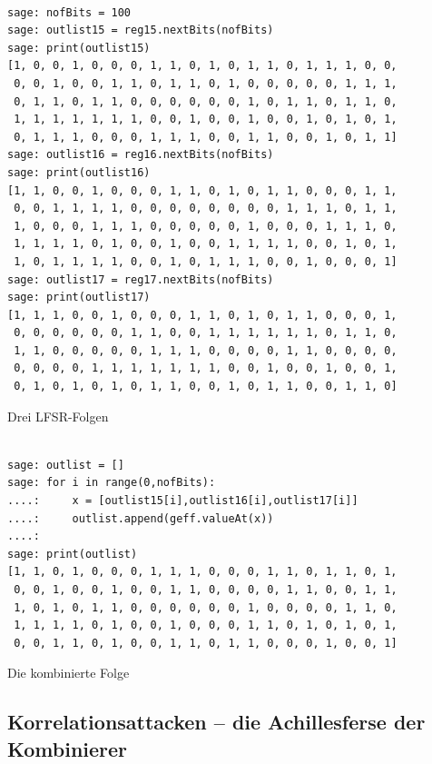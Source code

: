 \begin{refsegment}
\begin{sagecode}
\begin{verbatim}

sage: nofBits = 100
sage: outlist15 = reg15.nextBits(nofBits)
sage: print(outlist15)
[1, 0, 0, 1, 0, 0, 0, 1, 1, 0, 1, 0, 1, 1, 0, 1, 1, 1, 0, 0,
 0, 0, 1, 0, 0, 1, 1, 0, 1, 1, 0, 1, 0, 0, 0, 0, 0, 1, 1, 1,
 0, 1, 1, 0, 1, 1, 0, 0, 0, 0, 0, 0, 1, 0, 1, 1, 0, 1, 1, 0,
 1, 1, 1, 1, 1, 1, 1, 0, 0, 1, 0, 0, 1, 0, 0, 1, 0, 1, 0, 1,
 0, 1, 1, 1, 0, 0, 0, 1, 1, 1, 0, 0, 1, 1, 0, 0, 1, 0, 1, 1]
sage: outlist16 = reg16.nextBits(nofBits)
sage: print(outlist16)
[1, 1, 0, 0, 1, 0, 0, 0, 1, 1, 0, 1, 0, 1, 1, 0, 0, 0, 1, 1,
 0, 0, 1, 1, 1, 1, 0, 0, 0, 0, 0, 0, 0, 0, 1, 1, 1, 0, 1, 1,
 1, 0, 0, 0, 1, 1, 1, 0, 0, 0, 0, 0, 1, 0, 0, 0, 1, 1, 1, 0,
 1, 1, 1, 1, 0, 1, 0, 0, 1, 0, 0, 1, 1, 1, 1, 0, 0, 1, 0, 1,
 1, 0, 1, 1, 1, 1, 0, 0, 1, 0, 1, 1, 1, 0, 0, 1, 0, 0, 0, 1]
sage: outlist17 = reg17.nextBits(nofBits)
sage: print(outlist17)
[1, 1, 1, 0, 0, 1, 0, 0, 0, 1, 1, 0, 1, 0, 1, 1, 0, 0, 0, 1,
 0, 0, 0, 0, 0, 0, 1, 1, 0, 0, 1, 1, 1, 1, 1, 1, 0, 1, 1, 0,
 1, 1, 0, 0, 0, 0, 0, 1, 1, 1, 0, 0, 0, 0, 1, 1, 0, 0, 0, 0,
 0, 0, 0, 0, 1, 1, 1, 1, 1, 1, 1, 0, 0, 1, 0, 0, 1, 0, 0, 1,
 0, 1, 0, 1, 0, 1, 0, 1, 1, 0, 0, 1, 0, 1, 1, 0, 0, 1, 1, 0]
\end{verbatim}
\caption{Drei LFSR-Folgen}\label{Sage-code-bool-seqs}
\end{sagecode}
\clearpage

\begin{sagecode}
\begin{verbatim}

sage: outlist = []
sage: for i in range(0,nofBits):
....:     x = [outlist15[i],outlist16[i],outlist17[i]]
....:     outlist.append(geff.valueAt(x))
....:
sage: print(outlist)
[1, 1, 0, 1, 0, 0, 0, 1, 1, 1, 0, 0, 0, 1, 1, 0, 1, 1, 0, 1,
 0, 0, 1, 0, 0, 1, 0, 0, 1, 1, 0, 0, 0, 0, 1, 1, 0, 0, 1, 1,
 1, 0, 1, 0, 1, 1, 0, 0, 0, 0, 0, 0, 1, 0, 0, 0, 0, 1, 1, 0,
 1, 1, 1, 1, 0, 1, 0, 0, 1, 0, 0, 0, 1, 1, 0, 1, 0, 1, 0, 1,
 0, 0, 1, 1, 0, 1, 0, 0, 1, 1, 0, 1, 1, 0, 0, 0, 1, 0, 0, 1]
\end{verbatim}
\caption{Die kombinierte Folge}\label{Sage-code-bool-gef-seq}
\end{sagecode}

\subsection{Korrelationsattacken
    -- die Achillesferse der Kombinierer}\label{ss-bool-bsana}


\end{refsegment}
